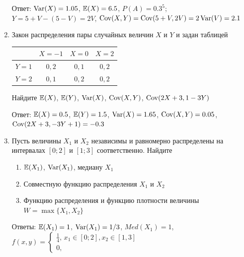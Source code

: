 \documentclass[12pt, a4paper]{article}\usepackage[]{graphicx}\usepackage[]{color}
\begin{document}
\begin{enumerate}
Ответ: $\operatorname{Var}(X)=1.05$, $\mathbb{E}(X)=6.5$, $P(A)=0.3^5$; $Y=5+V-(5-V)=2V$, $\operatorname{Cov}(X,Y)=\operatorname{Cov}(5+V,2V)=2\operatorname{Var}(V)=2.1$

\item Закон распределения пары случайных величин $X$ и $Y$  и  задан таблицей

\begin{tabular}{c|ccc}
 & $X=-1$ & $X=0$ & $X=2$ \\
\hline
$Y=1$ & $0{,}2$ & $0{,}1$ & $0{,}2$ \\
$Y=2$ & $0{,}1$ & $0{,}2$ & $0{,}2$ \\
\end{tabular}


Найдите $\mathbb{E}(X)$, $\mathbb{E}(Y)$, $\operatorname{Var}(X)$, $\operatorname{Cov}(X,Y)$, $\operatorname{Cov}(2X+3,1-3Y)$

Ответ: $\mathbb{E}(X)=0.5$, $\mathbb{E}(Y)=1.5$, $\operatorname{Var}(X)=1.65$, $\operatorname{Cov}(X,Y)=0.05$, $\operatorname{Cov}(2X+3,-3Y+1)=-0.3$

\item Пусть величины $X_1$ и $X_2$ независимы и равномерно распределены на интервалах $[0;2]$ и $[1;3]$ соответственно. Найдите
\begin{enumerate}
\item $\mathbb{E}(X_1)$, $\operatorname{Var}(X_1)$, медиану $X_1$
\item Совместную функцию распределения $X_1$ и $X_2$
\item Функцию распределения и функцию плотности величины $W=\max\{X_1,X_2\}$
\end{enumerate}

Ответы: $\mathbb{E}(X_1)=1$, $\operatorname{Var}(X_1)=1/3$, $Med(X_1)=1$, $f(x,y)=\begin{cases}
\frac{1}{4}, \, x_1\in [0;2], x_2\in [1,3] \\
0,
\end{cases}$
\end{enumerate}
\end{document}
